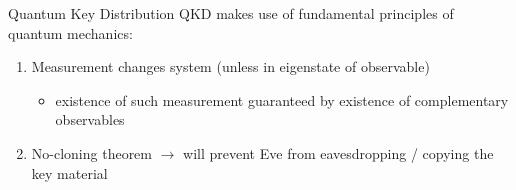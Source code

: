 \documentclass{beamer}
\begin{document}
	\begin{frame}{Quantum Key Distribution}
		QKD makes use of fundamental principles of quantum mechanics:

		\begin{enumerate}
			\item<2-> Measurement changes system {\tiny (unless in
			eigenstate of observable)}

			\begin{itemize}
				\item<3-> existence of such measurement guaranteed by
				existence of complementary observables
			\end{itemize}

			\item<4-> No-cloning theorem $\rightarrow$ will prevent Eve
			from eavesdropping / copying the key material
		\end{enumerate}
	\end{frame}
\end{document}
